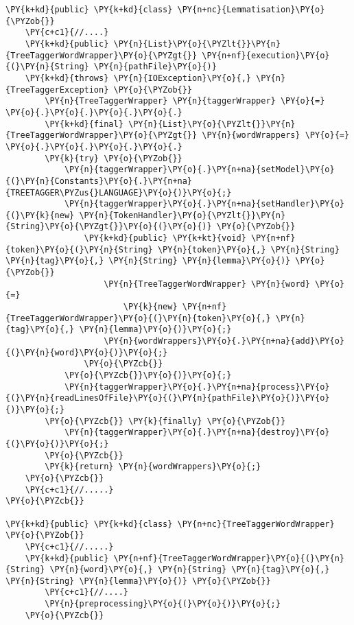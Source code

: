 \begin{Verbatim}[frame=single,commandchars=\\\{\}]
\PY{k+kd}{public} \PY{k+kd}{class} \PY{n+nc}{Lemmatisation}\PY{o}{\PYZob{}}
    \PY{c+c1}{//....}
    \PY{k+kd}{public} \PY{n}{List}\PY{o}{\PYZlt{}}\PY{n}{TreeTaggerWordWrapper}\PY{o}{\PYZgt{}} \PY{n+nf}{execution}\PY{o}{(}\PY{n}{String} \PY{n}{pathFile}\PY{o}{)} 
    \PY{k+kd}{throws} \PY{n}{IOException}\PY{o}{,} \PY{n}{TreeTaggerException} \PY{o}{\PYZob{}}
        \PY{n}{TreeTaggerWrapper} \PY{n}{taggerWrapper} \PY{o}{=} \PY{o}{.}\PY{o}{.}\PY{o}{.}\PY{o}{.}
        \PY{k+kd}{final} \PY{n}{List}\PY{o}{\PYZlt{}}\PY{n}{TreeTaggerWordWrapper}\PY{o}{\PYZgt{}} \PY{n}{wordWrappers} \PY{o}{=} \PY{o}{.}\PY{o}{.}\PY{o}{.}\PY{o}{.}
        \PY{k}{try} \PY{o}{\PYZob{}}
            \PY{n}{taggerWrapper}\PY{o}{.}\PY{n+na}{setModel}\PY{o}{(}\PY{n}{Constants}\PY{o}{.}\PY{n+na}{TREETAGGER\PYZus{}LANGUAGE}\PY{o}{)}\PY{o}{;}
            \PY{n}{taggerWrapper}\PY{o}{.}\PY{n+na}{setHandler}\PY{o}{(}\PY{k}{new} \PY{n}{TokenHandler}\PY{o}{\PYZlt{}}\PY{n}{String}\PY{o}{\PYZgt{}}\PY{o}{(}\PY{o}{)} \PY{o}{\PYZob{}}
                \PY{k+kd}{public} \PY{k+kt}{void} \PY{n+nf}{token}\PY{o}{(}\PY{n}{String} \PY{n}{token}\PY{o}{,} \PY{n}{String} \PY{n}{tag}\PY{o}{,} \PY{n}{String} \PY{n}{lemma}\PY{o}{)} \PY{o}{\PYZob{}}
                    \PY{n}{TreeTaggerWordWrapper} \PY{n}{word} \PY{o}{=} 
                        \PY{k}{new} \PY{n+nf}{TreeTaggerWordWrapper}\PY{o}{(}\PY{n}{token}\PY{o}{,} \PY{n}{tag}\PY{o}{,} \PY{n}{lemma}\PY{o}{)}\PY{o}{;}
                    \PY{n}{wordWrappers}\PY{o}{.}\PY{n+na}{add}\PY{o}{(}\PY{n}{word}\PY{o}{)}\PY{o}{;}
                \PY{o}{\PYZcb{}}
            \PY{o}{\PYZcb{}}\PY{o}{)}\PY{o}{;}
            \PY{n}{taggerWrapper}\PY{o}{.}\PY{n+na}{process}\PY{o}{(}\PY{n}{readLinesOfFile}\PY{o}{(}\PY{n}{pathFile}\PY{o}{)}\PY{o}{)}\PY{o}{;}
        \PY{o}{\PYZcb{}} \PY{k}{finally} \PY{o}{\PYZob{}}
            \PY{n}{taggerWrapper}\PY{o}{.}\PY{n+na}{destroy}\PY{o}{(}\PY{o}{)}\PY{o}{;}
        \PY{o}{\PYZcb{}}
        \PY{k}{return} \PY{n}{wordWrappers}\PY{o}{;}
    \PY{o}{\PYZcb{}}
    \PY{c+c1}{//.....}
\PY{o}{\PYZcb{}}

\PY{k+kd}{public} \PY{k+kd}{class} \PY{n+nc}{TreeTaggerWordWrapper} \PY{o}{\PYZob{}}
    \PY{c+c1}{//.....}
    \PY{k+kd}{public} \PY{n+nf}{TreeTaggerWordWrapper}\PY{o}{(}\PY{n}{String} \PY{n}{word}\PY{o}{,} \PY{n}{String} \PY{n}{tag}\PY{o}{,} \PY{n}{String} \PY{n}{lemma}\PY{o}{)} \PY{o}{\PYZob{}}
        \PY{c+c1}{//....}
        \PY{n}{preprocessing}\PY{o}{(}\PY{o}{)}\PY{o}{;}
    \PY{o}{\PYZcb{}}


\end{Verbatim}
